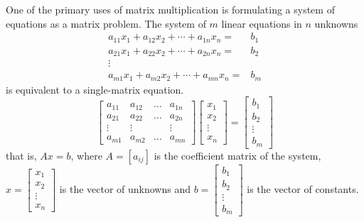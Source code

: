\documentclass[../main.tex]{subfiles}
\begin{document}
One of the primary uses of matrix multiplication is formulating a system of equations as a matrix problem. The system of $m$ linear equations in $n$ unknowns
$$
\begin{aligned}
a_{11} x_{1}+a_{12} x_{2}+\cdots+a_{1 n} x_{n}=& b_{1} \\
a_{21} x_{1}+a_{22} x_{2}+\cdots+a_{2 n} x_{n}=& b_{2} \\
\vdots & \\
a_{m 1} x_{1}+a_{m 2} x_{2}+\cdots+a_{m n} x_{n}=&b_{m}
\end{aligned}
$$
is equivalent to a single-matrix equation.
$$
\left[\begin{array}{llll}
a_{11} & a_{12} & \ldots & a_{1 n} \\
a_{21} & a_{22} & \ldots & a_{2 n} \\
\vdots & \vdots & & \vdots \\
a_{m 1} & a_{m 2} & \ldots & a_{m n}
\end{array}\right]\left[\begin{array}{c}
x_{1} \\
x_{2} \\
\vdots \\
x_{n}
\end{array}\right]=\left[\begin{array}{c}
b_{1} \\
b_{2} \\
\vdots \\
b_{m}
\end{array}\right]
$$
that is, $A x=b$, where $A=\left[a_{i j}\right]$ is the coefficient matrix of the system, $x=\left[\begin{array}{l}x_{1} \\ x_{2} \\ \vdots \\ x_{n}\end{array}\right]$ is the vector of unknowns and $b=\left[\begin{array}{l}b_{1} \\ b_{2} \\ \vdots \\ b_{m}\end{array}\right]$ is the vector of constants.
\end{document}
